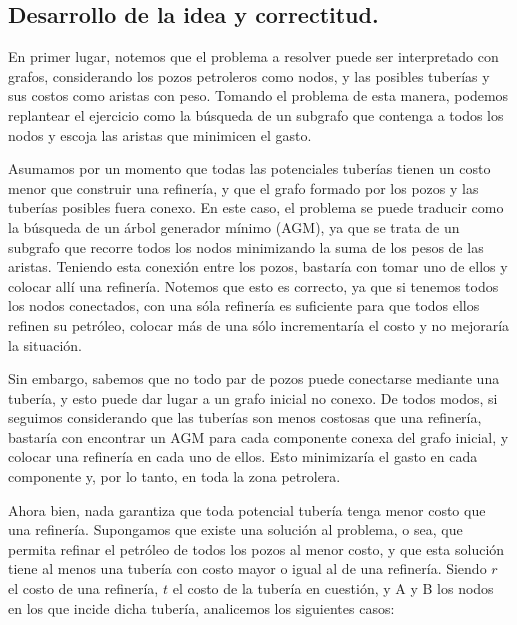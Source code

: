 \vspace*{0.6cm}

\subsection{Desarrollo de la idea y correctitud.}

\vspace*{0.3cm}

En primer lugar, notemos que el problema a resolver puede ser interpretado con grafos, considerando los pozos petroleros como nodos, y las posibles tuberías y sus costos como aristas con peso.  Tomando el problema de esta manera, podemos replantear el ejercicio como la búsqueda de un subgrafo que contenga a todos los nodos y escoja las aristas que minimicen el gasto.

Asumamos por un momento que todas las potenciales tuberías tienen un costo menor que construir una refinería, y que el grafo formado por los pozos y las tuberías posibles fuera conexo.  En este caso, el problema se puede traducir como la búsqueda de un árbol generador mínimo (AGM), ya que se trata de un subgrafo que recorre todos los nodos minimizando la suma de los pesos de las aristas.  Teniendo esta conexión entre los pozos, bastaría con tomar uno de ellos y colocar allí una refinería. Notemos que esto es correcto, ya que si tenemos todos los nodos conectados, con una sóla refinería es suficiente para que todos ellos refinen su petróleo, colocar más de una sólo incrementaría el costo y no mejoraría la situación.

Sin embargo, sabemos que no todo par de pozos puede conectarse mediante una tubería, y esto puede dar lugar a un grafo inicial no conexo.  De todos modos, si seguimos considerando que las tuberías son menos costosas que una refinería, bastaría con encontrar un AGM para cada componente conexa del grafo inicial, y colocar una refinería en cada uno de ellos. Esto minimizaría el gasto en cada componente y, por lo tanto, en toda la zona petrolera. 

Ahora bien, nada garantiza que toda potencial tubería tenga menor costo que una refinería. Supongamos que existe una solución al problema, o sea, que permita refinar el petróleo de todos los pozos al menor costo, y que esta solución tiene al menos una tubería con costo mayor o igual al de una refinería. Siendo $r$ el costo de una refinería, $t$ el costo de la tubería en cuestión, y A y B los nodos en los que incide dicha tubería, analicemos los siguientes casos:

